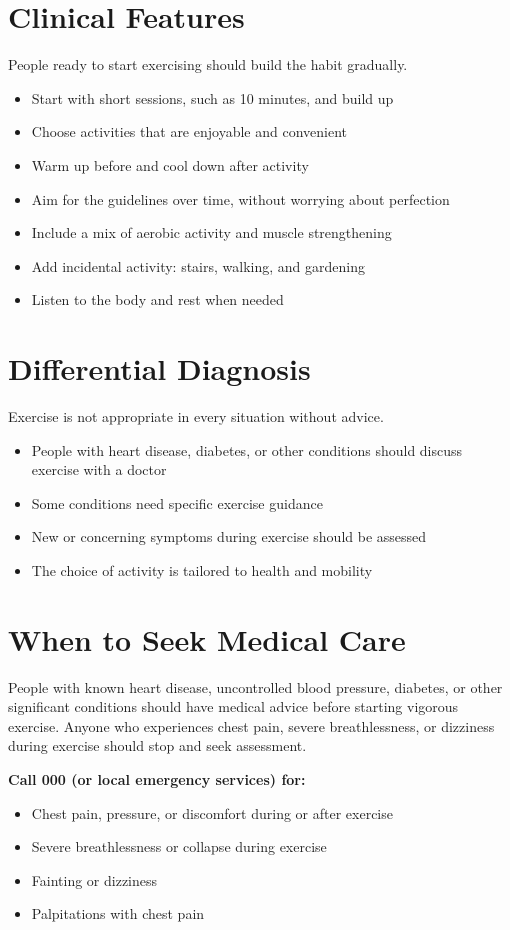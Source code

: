 \section*{Clinical Features}
People ready to start exercising should build the habit gradually.
\begin{itemize}
    \item Start with short sessions, such as 10 minutes, and build up
    \item Choose activities that are enjoyable and convenient
    \item Warm up before and cool down after activity
    \item Aim for the guidelines over time, without worrying about perfection
    \item Include a mix of aerobic activity and muscle strengthening
    \item Add incidental activity: stairs, walking, and gardening
    \item Listen to the body and rest when needed
\end{itemize}

\section*{Differential Diagnosis}
Exercise is not appropriate in every situation without advice.
\begin{itemize}
    \item People with heart disease, diabetes, or other conditions should discuss exercise with a doctor
    \item Some conditions need specific exercise guidance
    \item New or concerning symptoms during exercise should be assessed
    \item The choice of activity is tailored to health and mobility
\end{itemize}

\section*{When to Seek Medical Care}
People with known heart disease, uncontrolled blood pressure, diabetes, or other significant conditions should have medical advice before starting vigorous exercise. Anyone who experiences chest pain, severe breathlessness, or dizziness during exercise should stop and seek assessment.

\textbf{Call 000 (or local emergency services) for:}
\begin{itemize}
    \item Chest pain, pressure, or discomfort during or after exercise
    \item Severe breathlessness or collapse during exercise
    \item Fainting or dizziness
    \item Palpitations with chest pain
\end{itemize}

